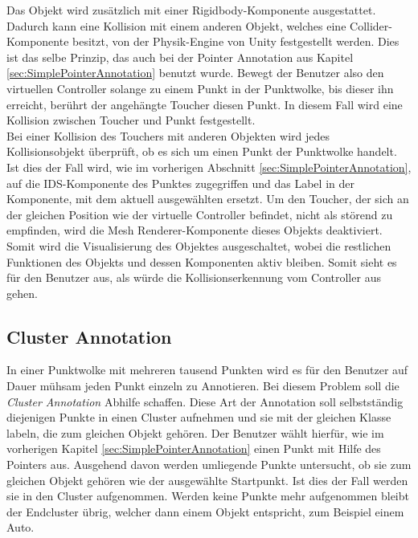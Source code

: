 Das Objekt wird zusätzlich mit einer Rigidbody-Komponente ausgestattet. Dadurch kann eine Kollision mit einem anderen Objekt, welches eine Collider-Komponente besitzt, von der Physik-Engine von Unity festgestellt werden. Dies ist das selbe Prinzip, das auch bei der Pointer Annotation aus Kapitel \ref{sec:SimplePointerAnnotation} benutzt wurde. Bewegt der Benutzer also den virtuellen Controller solange zu einem Punkt in der Punktwolke, bis dieser ihn erreicht, berührt der angehängte Toucher diesen Punkt. In diesem Fall wird eine Kollision zwischen Toucher und Punkt festgestellt.\\

Bei einer Kollision des Touchers mit anderen Objekten wird jedes Kollisionsobjekt überprüft, ob es sich um einen Punkt der Punktwolke handelt. Ist dies der Fall wird, wie im vorherigen Abschnitt \ref{sec:SimplePointerAnnotation}, auf die IDS-Komponente des Punktes zugegriffen und das Label in der Komponente, mit dem aktuell ausgewählten ersetzt. Um den Toucher, der sich an der gleichen Position wie der virtuelle Controller befindet, nicht als störend zu empfinden, wird die Mesh Renderer-Komponente dieses Objekts deaktiviert. Somit wird die Visualisierung des Objektes ausgeschaltet, wobei die restlichen Funktionen des Objekts und dessen Komponenten aktiv bleiben. Somit sieht es für den Benutzer aus, als würde die Kollisionserkennung vom Controller aus gehen. 


\subsection{Cluster Annotation}
\label{sec:ClusterLabeling}
In einer Punktwolke mit mehreren tausend Punkten wird es für den Benutzer auf Dauer mühsam jeden Punkt einzeln zu Annotieren. Bei diesem Problem soll die \textit{Cluster Annotation} Abhilfe schaffen. Diese Art der Annotation soll selbstständig diejenigen Punkte in einen Cluster aufnehmen und sie mit der gleichen Klasse labeln, die zum gleichen Objekt gehören. Der Benutzer wählt hierfür, wie im vorherigen Kapitel \ref{sec:SimplePointerAnnotation} einen Punkt mit Hilfe des Pointers aus. Ausgehend davon werden umliegende Punkte untersucht, ob sie zum gleichen Objekt gehören wie der ausgewählte Startpunkt. Ist dies der Fall werden sie in den Cluster aufgenommen. Werden keine Punkte mehr aufgenommen bleibt der Endcluster übrig, welcher dann einem Objekt entspricht, zum Beispiel einem Auto. \\


